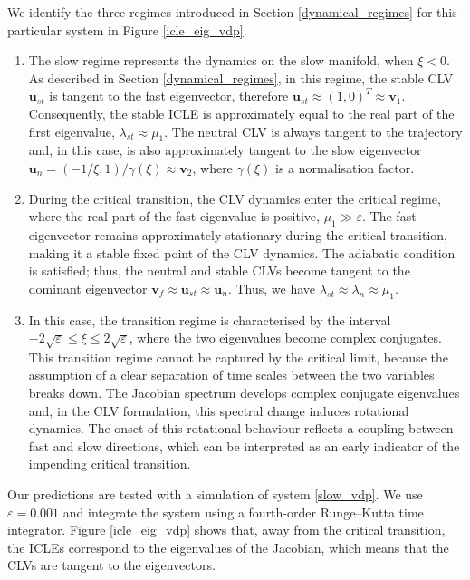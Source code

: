 \documentclass[aps,reprint,prx]{revtex4-2}
\begin{document}
We identify the three regimes introduced in Section \ref{dynamical_regimes} for this particular system in Figure \ref{icle_eig_vdp}. 
\begin{enumerate}
\item The slow regime represents the dynamics on the slow manifold, when $\xi < 0$. As described in Section \ref{dynamical_regimes}, in this regime, the stable CLV $\mathbf{u}_{st}$ is tangent to the fast eigenvector, therefore $\mathbf{u}_{st} \approx \left(1,0\right)^T \approx \mathbf{v}_1$. Consequently, the stable ICLE is approximately equal to the real part of the first eigenvalue, $\lambda_{st} \approx \mu_1$. The neutral CLV is always tangent to the trajectory and, in this case, is also approximately tangent to the slow eigenvector $\mathbf{u}_n = \left( -1/\xi, 1\right)/\gamma(\xi) \approx \mathbf{v}_2$, where $\gamma(\xi)$ is a normalisation factor.
%
\item During the critical transition, the CLV dynamics enter the critical regime, where the real part of the fast eigenvalue is positive, $\mu_1 \gg \varepsilon$. The fast eigenvector remains approximately stationary during the critical transition, making it a stable fixed point of the CLV dynamics. The adiabatic condition is satisfied; thus, the neutral and stable CLVs become tangent to the dominant eigenvector $\mathbf{v}_f \approx\mathbf{u}_{st} \approx\mathbf{u}_n$. Thus, we have $\lambda_{st} \approx \lambda_n \approx \mu_1$.

\item {In this case, the transition regime is characterised by the interval $-2\sqrt{\varepsilon} \leq \xi \leq 2\sqrt{\varepsilon}$, where the two eigenvalues become complex conjugates. This transition regime cannot be captured by the critical limit, because the assumption of a clear separation of time scales between the two variables breaks down. The Jacobian spectrum develops complex conjugate eigenvalues and, in the CLV formulation, this spectral change induces rotational dynamics. The onset of this rotational behaviour reflects a coupling between fast and slow directions, which can be interpreted as an early indicator of the impending critical transition.} 
\end{enumerate}

Our predictions are tested with a simulation of system \eqref{slow_vdp}. We use $\varepsilon = 0.001$ and integrate the system using a fourth-order Runge–Kutta time integrator. 
Figure \ref{icle_eig_vdp} shows that, away from the critical transition, the ICLEs correspond to the eigenvalues of the Jacobian, which means that the CLVs are tangent to the eigenvectors.
\end{document}

